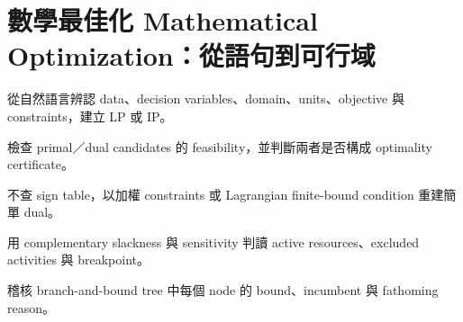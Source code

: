 \documentclass[11pt,a4paper,oneside,openany]{book}
\begin{document}
\chapter{數學最佳化 Mathematical Optimization：從語句到可行域}
\label{ch:optimization}
\begin{chaptermastery}
\item 從自然語言辨認 data、decision variables、domain、units、objective 與 constraints，建立 LP 或 IP。
\item 檢查 primal／dual candidates 的 feasibility，並判斷兩者是否構成 optimality certificate。
\item 不查 sign table，以加權 constraints 或 Lagrangian finite-bound condition 重建簡單 dual。
\item 用 complementary slackness 與 sensitivity 判讀 active resources、excluded activities 與 breakpoint。
\item 稽核 branch-and-bound tree 中每個 node 的 bound、incumbent 與 fathoming reason。
\end{chaptermastery}
\end{document}
